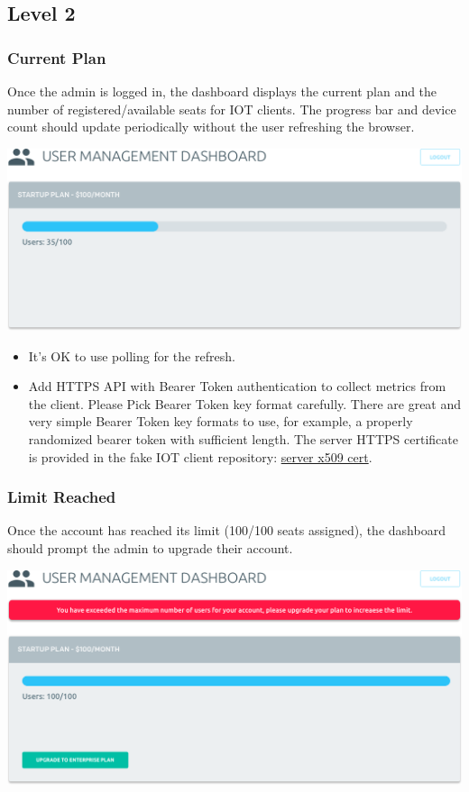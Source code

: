 \documentclass{article}
\begin{document}
  \subsection*{Level 2}

  \subsubsection{Current Plan}
  
  Once the admin is logged in, the dashboard displays the current plan and the number of registered/available seats for IOT clients. The progress bar and device count should update periodically without the user refreshing the browser.

  \begin{center}
    \includegraphics[width=\textwidth]{dashboard-initial}
  \end{center}
  
  \begin{itemize}
  \item It's OK to use polling for the refresh.
  \item Add HTTPS API with Bearer Token authentication to collect metrics from the client.
     Please Pick Bearer Token key format carefully. There are great and very simple Bearer Token key formats to use, for example, a properly randomized bearer token with sufficient length. The server HTTPS certificate is provided in the fake IOT client repository: \href{https://github.com/gravitational/fakeiot/tree/master/fixtures}{server x509 cert}.
  \end{itemize}

  \subsubsection{Limit Reached}
   Once the account has reached its limit (100/100 seats assigned), the dashboard should prompt the admin to upgrade their account.

  \begin{center}
  \includegraphics[width=\textwidth]{dashboard-full}
  \end{center}
\end{document}
